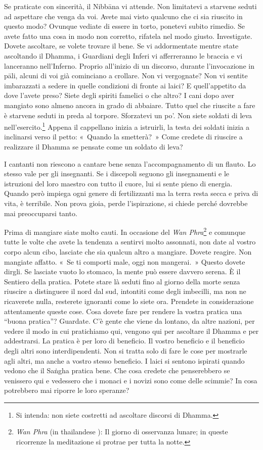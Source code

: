 Se praticate con sincerità, il Nibbāna vi attende. Non limitatevi
a starvene seduti ad aspettare che venga da voi. Avete mai visto
qualcuno che ci sia riuscito in questo modo? Ovunque vediate di essere
in torto, ponetevi subito rimedio. Se avete fatto una cosa in modo non
corretto, rifatela nel modo giusto. Investigate. Dovete ascoltare, se
volete trovare il bene. Se vi addormentate mentre state ascoltando il
Dhamma, i Guardiani degli Inferi vi afferreranno le braccia e vi
lanceranno nell'Inferno. Proprio all'inizio di un discorso, durante
l'invocazione in pāli, alcuni di voi già cominciano a crollare. Non vi
vergognate? Non vi sentite imbarazzati a sedere in quelle condizioni di
fronte ai laici? E quell'appetito da dove l'avete preso? Siete degli
spiriti famelici o che altro? I cani dopo aver mangiato sono almeno
ancora in grado di abbaiare. Tutto quel che riuscite a fare è starvene
seduti in preda al torpore. Sforzatevi un po'. Non siete soldati di leva
nell'esercito.\footnote{Si intenda: non siete costretti ad ascoltare
  discorsi di Dhamma.} Appena il cappellano inizia a istruirli, la testa
dei soldati inizia a inclinarsi verso il petto: «~Quando la smetterà?~»
Come credete di riuscire a realizzare il Dhamma se pensate come un
soldato di leva?

I cantanti non riescono a cantare bene senza l'accompagnamento di un
flauto. Lo stesso vale per gli insegnanti. Se i discepoli seguono gli
insegnamenti e le istruzioni del loro maestro con tutto il cuore, lui si
sente pieno di energia. Quando però impiega ogni genere di fertilizzanti
ma la terra resta secca e priva di vita, è terribile. Non prova gioia,
perde l'ispirazione, si chiede perché dovrebbe mai preoccuparsi tanto.

Prima di mangiare siate molto cauti. In occasione del \emph{Wan
Phra}\footnote{\emph{Wan Phra} (in thailandese ): Il giorno di
  osservanza lunare; in queste ricorrenze la meditazione si protrae per
  tutta la notte.} e comunque tutte le volte che avete la tendenza a
sentirvi molto assonnati, non date al vostro corpo alcun cibo, lasciate
che sia qualcun altro a mangiare. Dovete reagire. Non mangiate affatto.
«~Se ti comporti male, oggi non mangerai.~» Questo dovete dirgli. Se
lasciate vuoto lo stomaco, la mente può essere davvero serena. È il
Sentiero della pratica. Potete stare là seduti fino al giorno della
morte senza riuscire a distinguere il nord dal sud, intontiti come degli
imbecilli, ma non ne ricaverete nulla, resterete ignoranti come lo siete
ora. Prendete in considerazione attentamente queste cose. Cosa dovete
fare per rendere la vostra pratica una ``buona pratica''? Guardate. C'è
gente che viene da lontano, da altre nazioni, per vedere il modo in cui
pratichiamo qui, vengono qui per ascoltare il Dhamma e per addestrarsi.
La pratica è per loro di beneficio. Il vostro beneficio e il beneficio
degli altri sono interdipendenti. Non si tratta solo di fare le cose per
mostrarle agli altri, ma anche a vostro stesso beneficio. I laici si
sentono ispirati quando vedono che il Saṅgha pratica bene. Che cosa
credete che penserebbero se venissero qui e vedessero che i monaci e i
novizi sono come delle scimmie? In cosa potrebbero mai riporre le loro
speranze?

